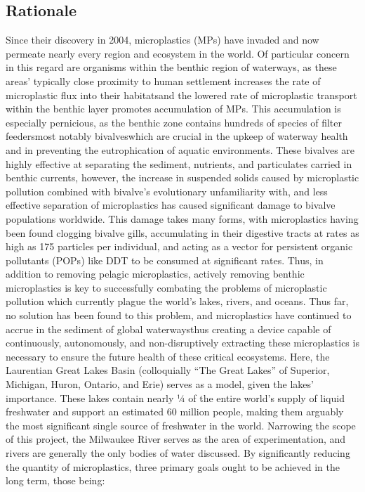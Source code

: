 \documentclass[fleqn,10pt]{SelfArx} %
\begin{document}
	\subsection{Rationale}
	Since their discovery in 2004, microplastics (MPs) have invaded and now permeate nearly every region and ecosystem in the world. Of particular concern in this regard are organisms within the \gls{benthic} region of waterways, as these areas’ typically close proximity to human settlement increases the rate of microplastic flux into their habitats\textemdash and the lowered rate of microplastic transport within the \gls{benthic} layer promotes accumulation of MPs. This accumulation is especially pernicious, as the \gls{benthic} zone contains hundreds of species of filter feeders\textemdash most notably bivalves\textemdash which are crucial in the upkeep of waterway health and in preventing the eutrophication of aquatic environments. These bivalves are highly effective at separating the sediment, nutrients, and particulates carried in \gls{benthic} currents, however, the increase in suspended solids caused by microplastic pollution combined with bivalve’s evolutionary unfamiliarity with, and less effective separation of microplastics has caused significant damage to bivalve populations worldwide. This damage takes many forms, with microplastics having been found clogging bivalve gills, accumulating in their digestive tracts at rates as high as 175 particles per individual, and acting as a vector for persistent organic pollutants (POPs) like DDT to be consumed at significant rates. Thus, in addition to removing \gls{pelagic} microplastics, actively removing \gls{benthic} microplastics is key to successfully combating the problems of microplastic pollution which currently plague the world’s lakes, rivers, and oceans. Thus far, no solution has been found to this problem, and microplastics have continued to accrue in the sediment of global waterways\textemdash thus creating a device capable of continuously, autonomously, and non-disruptively extracting these microplastics is necessary to ensure the future health of these critical ecosystems. Here, the Laurentian Great Lakes Basin (colloquially “The Great Lakes” of Superior, Michigan, Huron, Ontario, and Erie) serves as a model, given the lakes’ importance. These lakes contain nearly ¼ of the entire world’s supply of liquid freshwater and support an estimated 60 million people, making them arguably the most significant single source of freshwater in the world. Narrowing the scope of this project, the Milwaukee River serves as the area of experimentation, and rivers are generally the only bodies of water discussed. By significantly reducing the quantity of microplastics, three primary goals ought to be achieved in the long term, those being: 
\end{document}
